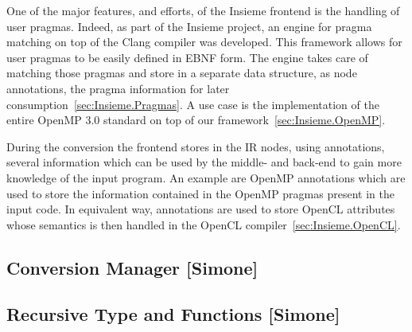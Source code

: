 One of the major features, and efforts, of the Insieme frontend is the handling
of user pragmas. Indeed, as part of the Insieme project, an engine for pragma
matching on top of the Clang compiler was developed. This framework allows for
user pragmas to be easily defined in EBNF form. The engine takes care of
matching those pragmas and store in a separate data structure, as node
annotations, the pragma information for later
consumption~\ref{sec:Insieme.Pragmas}. A use case is the implementation of the
entire OpenMP 3.0 standard on top of our framework~\ref{sec:Insieme.OpenMP}.

During the conversion the frontend stores in the IR nodes, using annotations,
several information which can be used by the middle- and back-end to gain more
knowledge of the input program. An example are OpenMP annotations which are used
to store the information contained in the OpenMP pragmas present in the input
code. In equivalent way, annotations are used to store OpenCL attributes whose
semantics is then handled in the OpenCL compiler~\ref{sec:Insieme.OpenCL}.







\subsection{Conversion Manager [Simone]}
\label{sec:Insieme.Frontend.Convert}

\subsection{Recursive Type and Functions [Simone]}
\label{sec:Insieme.Frontend.Recursion}





